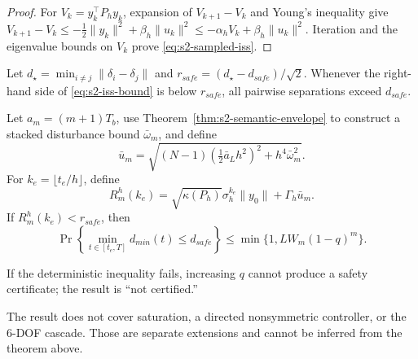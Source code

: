 \begin{proof}
For $V_k=y_k^\top P_hy_k$, expansion of
$V_{k+1}-V_k$ and Young's inequality give
$V_{k+1}-V_k\le-\tfrac12\|y_k\|^2+\beta_h\|u_k\|^2
\le-\alpha_hV_k+\beta_h\|u_k\|^2$.  Iteration and the eigenvalue bounds on
$V_k$ prove \eqref{eq:s2-sampled-iss}.
\end{proof}

Let $d_\star=\min_{i\ne j}\|\delta_i-\delta_j\|$ and
$r_{safe}=(d_\star-d_{safe})/\sqrt2$.  Whenever the right-hand side of
\eqref{eq:s2-iss-bound} is below $r_{safe}$, all pairwise separations exceed
$d_{safe}$.

\begin{corollary}
Let $a_m=(m+1)T_b$, use
Theorem~\ref{thm:s2-semantic-envelope} to construct a stacked disturbance
bound $\bar\omega_m$, and define
\begin{equation}
\bar u_m=\sqrt{(N-1)(\tfrac12\bar a_Lh^2)^2+h^4\bar\omega_m^2}.
\end{equation}
For $k_e=\lfloor t_e/h\rfloor$, define
\begin{equation}
R_m^h(k_e)=\sqrt{\kappa(P_h)}\sigma_h^{k_e}\|y_0\|
+\Gamma_h\bar u_m.
\end{equation}
If $R_m^h(k_e)<r_{safe}$, then
\begin{equation}
\Pr\!\left\{\min_{t\in[t_e,T]}d_{min}(t)\le d_{safe}\right\}
\le\min\{1,LW_m(1-q)^m\}.
\label{eq:s2-safety-probability}
\end{equation}
\label{cor:s2-probabilistic-separation}
\end{corollary}

If the deterministic inequality fails, increasing $q$ cannot produce a safety
certificate; the result is ``not certified.''

The result does not cover saturation, a directed nonsymmetric controller, or
the 6-DOF cascade.  Those are separate extensions and cannot be inferred from
the theorem above.
